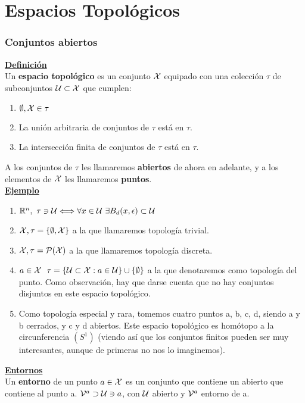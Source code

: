 \chapter{Espacios Topológicos}
\label{etop}

\subsection{Conjuntos abiertos}

\textbf{\underline{Definición}}\\
Un \textbf{espacio topológico} es un conjunto $\mathcal{X}$ equipado con una colección $\tau$ de subconjuntos $\mathcal{U} \subset \mathcal{X}$ que cumplen:
\begin{enumerate}
	\item $\emptyset, \mathcal{X} \in \tau$
	\item La unión arbitraria de conjuntos de $\tau$ está en $\tau$.
	\item La intersección finita de conjuntos de $\tau$ está en $\tau$.
\end{enumerate}
A los conjuntos de $\tau$ les llamaremos \textbf{abiertos} de ahora en adelante, y a los elementos de $\mathcal{X}$ les llamaremos \textbf{puntos}.\\

\textbf{\underline{Ejemplo}}
\begin{enumerate}
	\item $\mathbb{R}^{n},\ \tau \ni \mathcal{U} \Longleftrightarrow \forall x \in \mathcal{U} \ \exists B_{d}(x,\epsilon) \subset \mathcal{U}$
	\item $\mathcal{X}, \tau=\{\emptyset, \mathcal{X}\}$ a la que llamaremos topología trivial.
	\item $\mathcal{X}, \tau = \mathcal{P}(\mathcal{X})$ a la que llamaremos topología discreta.
	\item $a \in \mathcal{X}\ \ \tau=\{\mathcal{U} \subset \mathcal{X} : a \in \mathcal{U} \} \cup \{\emptyset\}$ a la que denotaremos como topología del punto. Como observación, hay que darse cuenta que no hay conjuntos disjuntos en este espacio topológico.
	\item Como topología especial y rara, tomemos cuatro puntos a, b, c, d, siendo a y b cerrados, y c y d abiertos. Este espacio topológico es homótopo a la circunferencia $(S^{1})$ (viendo así que los conjuntos finitos pueden ser muy interesantes, aunque de primeras no nos lo imaginemos).
\end{enumerate}

\textbf{\underline{Entornos}}\\
Un \textbf{entorno} de un punto $a \in \mathcal{X}$ es un conjunto que contiene un abierto que contiene al punto a.
$\mathcal{V}^{a} \supset \mathcal{U} \ni a$, con $\mathcal{U}$ abierto y $\mathcal{V}^{a}$ entorno de a.\\
\\

